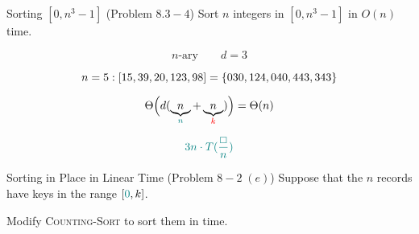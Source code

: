 
\begin{frame}{}
  \begin{exampleblock}{Sorting $[0, n^3-1]$ (Problem $8.3-4$)}
    Sort $n$ integers in $[0, n^3-1]$ in $O(n)$ time.
  \end{exampleblock}

  \pause
  \[
    n\text{-ary} \qquad d = 3
  \]

  \pause
  \[
    n = 5: [15, 39, 20, 123, 98] = \left\{030, 124, 040, 443, 343\right\}
  \]

  \pause
  \[
    \Theta\Big(d (\underbrace{n}_{\textcolor{teal}{n}} + \underbrace{n}_{\textcolor{red}{k}})\Big) = \Theta(n)
  \]

  \pause
  \vspace{0.30cm}
  \centerline{}

  \pause
  \vspace{0.30cm}
  \[
    \textcolor{teal}{3n \cdot T(\frac{\Box}{n})}
  \]
\end{frame}

\begin{frame}{}
  \begin{exampleblock}{Sorting in Place in Linear Time (Problem $8-2\; (e)$)}
    Suppose that the $n$ records have keys in the range $[\textcolor{teal}{0}, k]$.

    Modify \textsc{Counting-Sort} to sort them  in  time.
  \end{exampleblock}

  \begin{columns}
      \pause
      \pause

      \pause
  \end{columns}
\end{frame}

% 
